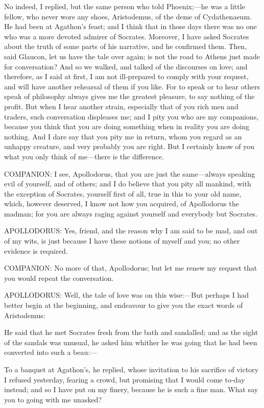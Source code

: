 \para[8] No indeed, I replied, but the same person who told Phoenix;---he was a little fellow, who never wore any shoes, Aristodemus, of the deme of Cydathenaeum. He had been at Agathon's feast; and I think that in those days there was no one who was a more devoted admirer of Socrates. Moreover, I have asked Socrates about the truth of some parts of his narrative, and he confirmed them. Then, said Glaucon, let us have the tale over again; is not the road to Athens just made for conversation? And so we walked, and talked of the discourses on love; and therefore, as I said at first, I am not ill-prepared to comply with your request, and will have another rehearsal of them if you like. For to speak or to hear others speak of philosophy always gives me the greatest pleasure, to say nothing of the profit. But when I hear another strain, especially that of you rich men and traders, such conversation displeases me; and I pity you who are my companions, because you think that you are doing something when in reality you are doing nothing. And I dare say that you pity me in return, whom you regard as an unhappy creature, and very probably you are right. But I certainly know of you what you only think of me---there is the difference.

\para[9] COMPANION: I see, Apollodorus, that you are just the same---always speaking evil of yourself, and of others; and I do believe that you pity all mankind, with the exception of Socrates, yourself first of all, true in this to your old name, which, however deserved, I know not how you acquired, of Apollodorus the madman; for you are always raging against yourself and everybody but Socrates.

\para[10] APOLLODORUS: Yes, friend, and the reason why I am said to be mad, and out of my wits, is just because I have these notions of myself and you; no other evidence is required.

\para[11] COMPANION: No more of that, Apollodorus; but let me renew my request that you would repeat the conversation.

\para[12] APOLLODORUS: Well, the tale of love was on this wise:---But perhaps I had better begin at the beginning, and endeavour to give you the exact words of Aristodemus:

\para[13] He said that he met Socrates fresh from the bath and sandalled; and as the sight of the sandals was unusual, he asked him whither he was going that he had been converted into such a beau:---

\para[14] To a banquet at Agathon's, he replied, whose invitation to his sacrifice of victory I refused yesterday, fearing a crowd, but promising that I would come to-day instead; and so I have put on my finery, because he is such a fine man. What say you to going with me unasked?

